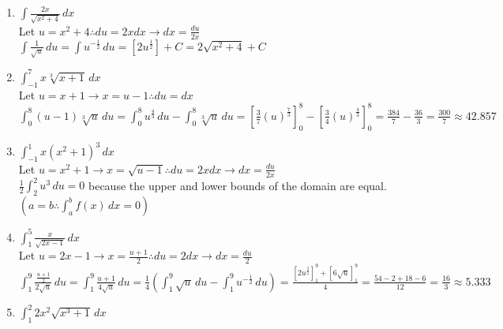 \documentclass[10pt, letterpaper]{report}
\begin{document}
\begin{enumerate}
  \item{$\int{\frac{2x}{\sqrt{x^{2}+4}}}\,dx$} \\

    Let $u=x^{2}+4\therefore du=2xdx\rightarrow dx=\frac{du}{2x}$ \\

    $\int{\frac{1}{\sqrt{u}}}\,du=
    \int{u^{-\frac{1}{2}}}\,du=
    [2u^{\frac{1}{2}}]+C=
    2\sqrt{x^{2}+4}+C$ \\

  \item{$\int_{-1}^{7}{x\sqrt[3]{x+1}}\,dx$} \\

    Let $u=x+1\rightarrow x=u-1\therefore du=dx$ \\

    $\int_{0}^{8}{(u-1)\sqrt[3]{u}}\,du=
    \int_{0}^{8}{u^{\frac{4}{3}}}\,du-\int_{0}^{8}{\sqrt[3]{u}}\,du=
    [\frac{3}{7}(u)^{\frac{7}{3}}]_{0}^{8}-[\frac{3}{4}(u)^{\frac{4}{3}}]_{0}^{8}=
    \frac{384}{7}-\frac{36}{3}=\frac{300}{7}\approx42.857$ \\

  \item{$\int_{-1}^{1}{x(x^{2}+1)^{3}}\,dx$} \\

    Let $u=x^{2}+1\rightarrow x=\sqrt{u-1}\therefore du=2xdx\rightarrow dx=\frac{du}{2x}$ \\

    $\frac{1}{2}\int_{2}^{2}{u^{3}}\,du=0$ because the upper and lower bounds of the domain are equal. $(a=b\therefore\int_{a}^{b}f(x)\,dx=0)$ \\

  \item{$\int_{1}^{5}{\frac{x}{\sqrt{2x-1}}}\,dx$} \\

    Let $u=2x-1\rightarrow x=\frac{u+1}{2}\therefore du=2dx\rightarrow dx=\frac{du}{2}$ \\

    $\int_{1}^{9}{\frac{\frac{u+1}{2}}{2\sqrt{u}}}\,du=
    \int_{1}^{9}{\frac{u+1}{4\sqrt{u}}}\,du=
    \frac{1}{4}(\int_{1}^{9}\sqrt{u}\,du-\int_{1}^{9}{u^{-\frac{1}{2}}}\,du)=
    \frac{[2u^{\frac{3}{2}}]_{1}^{9}+[6\sqrt{u}]_{1}^{9}}{4}=
    \frac{54-2+18-6}{12}=\frac{16}{3}\approx5.333$ \\

  \item{$\int_{1}^{2}{2x^{2}\sqrt{x^{3}+1}}\,dx$} \\


\end{enumerate}
\end{document}
